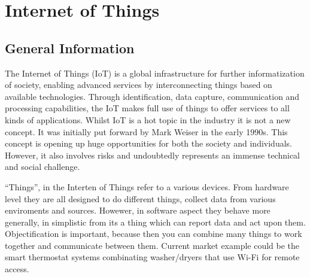 \section{Internet of Things} 
\subsection{General Information}
The Internet of Things (IoT) is a global infrastructure for further informatization of society, enabling advanced services by interconnecting things based on available technologies. Through identification, data capture, communication and processing capabilities, the IoT makes full use of things to offer services to all kinds of applications. Whilst IoT is a hot topic in the industry it is not a new concept. It was initially put forward by Mark Weiser in the early 1990s. This concept is opening up huge opportunities for both the society and individuals. However, it also involves risks and undoubtedly represents an immense technical and social challenge.\cite{iot}\

``Things'', in the Interten of Things refer to a various devices. From hardware level they are all designed to do different things, collect data from various enviroments and sources. Howewer, in software aspect they behave more generally, in simplistic from its a thing which can report data and act upon them. Objectification is important, because then you can combine many things to work together and communicate between them. Current market example could be the smart thermostat systems combinating washer/dryers that use Wi-Fi for remote access.

